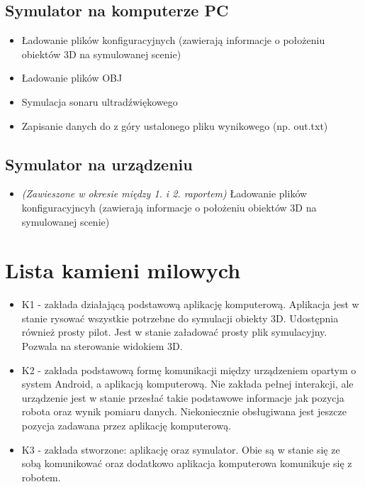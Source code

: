 \documentclass[a4paper,12pt]{article}
\begin{document}
\subsection{Symulator na komputerze PC}
\begin{itemize}
\item Ładowanie plików konfiguracyjnych (zawierają informacje o położeniu obiektów 3D na symulowanej scenie)
\item Ładowanie plików OBJ
\item Symulacja sonaru ultradźwiękowego
\item Zapisanie danych do z góry ustalonego pliku wynikowego (np. out.txt)
\end{itemize}
\subsection{Symulator na urządzeniu}
\begin{itemize}
\item \textit{ (Zawieszone w okresie między 1. i 2. raportem) }Ładowanie plików konfiguracyjncyh (zawierają informacje o położeniu obiektów 3D na symulowanej scenie)
\end{itemize}

\section{Lista kamieni milowych}
\begin{itemize}
\item K1 - zakłada działającą podstawową aplikację komputerową. Aplikacja jest w stanie rysować wszystkie potrzebne do symulacji obiekty 3D. Udostępnia również prosty pilot.
Jest w stanie załadować prosty plik symulacyjny. Pozwala na sterowanie widokiem 3D.
\item K2 - zakłada podstawową formę komunikacji między urządzeniem opartym o system Android, a aplikacją komputerową. Nie zakłada pełnej interakcji, ale urządzenie jest w stanie przesłać takie podstawowe informacje jak pozycja robota oraz wynik pomiaru danych. Niekoniecznie obsługiwana jest jeszcze pozycja zadawana przez aplikację komputerową.
\item K3 - zakłada stworzone: aplikację oraz symulator. Obie są w stanie się ze sobą komunikować oraz dodatkowo aplikacja komputerowa komunikuje się z robotem.
\end{itemize}
\end{document}
